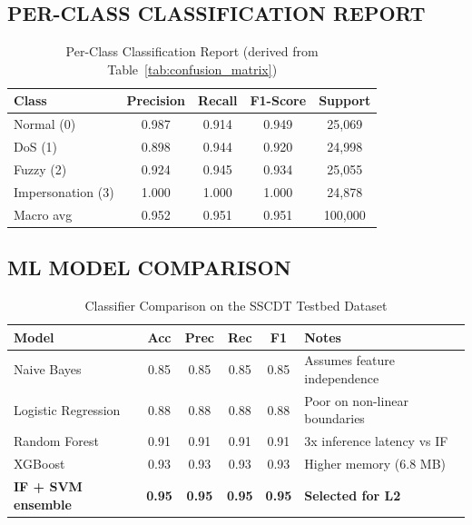 \documentclass[12pt,a4paper]{amritareport}
\begin{document}
\subsection{PER-CLASS CLASSIFICATION REPORT}

\begin{table}[H]
\centering
\caption{Per-Class Classification Report (derived from Table~\ref{tab:confusion_matrix})}
\label{tab:classification_report}
\begin{tabular}{@{}lcccc@{}}
\toprule
\textbf{Class} & \textbf{Precision} & \textbf{Recall} & \textbf{F1-Score} & \textbf{Support} \\
\midrule
Normal (0) & 0.987 & 0.914 & 0.949 & 25,069 \\
DoS (1) & 0.898 & 0.944 & 0.920 & 24,998 \\
Fuzzy (2) & 0.924 & 0.945 & 0.934 & 25,055 \\
Impersonation (3) & 1.000 & 1.000 & 1.000 & 24,878 \\
\midrule
Macro avg & 0.952 & 0.951 & 0.951 & 100,000 \\
\bottomrule
\end{tabular}
\end{table}

\subsection{ML MODEL COMPARISON}

\begin{table}[H]
\centering
\caption{Classifier Comparison on the SSCDT Testbed Dataset}
\label{tab:comparison_ml}
\small
\begin{tabular}{@{}lccccP{3.6cm}@{}}
\toprule
\textbf{Model} & \textbf{Acc} & \textbf{Prec} & \textbf{Rec} & \textbf{F1} & \textbf{Notes} \\
\midrule
Naive Bayes & 0.85 & 0.85 & 0.85 & 0.85 & Assumes feature independence \\
Logistic Regression & 0.88 & 0.88 & 0.88 & 0.88 & Poor on non-linear boundaries \\
Random Forest & 0.91 & 0.91 & 0.91 & 0.91 & 3x inference latency vs IF \\
XGBoost & 0.93 & 0.93 & 0.93 & 0.93 & Higher memory (6.8 MB) \\
\textbf{IF + SVM ensemble} & \textbf{0.95} & \textbf{0.95} & \textbf{0.95} & \textbf{0.95} & \textbf{Selected for L2} \\
\bottomrule
\end{tabular}
\end{table}
\end{document}
